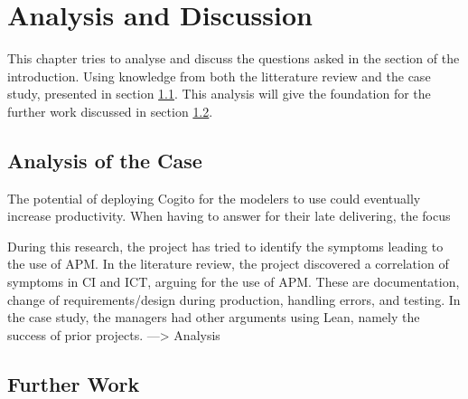 
\chapter{Analysis and Discussion}
This chapter tries to analyse and discuss the questions asked in the  section of the introduction. Using knowledge from both the litterature review and the case study, presented in section \ref{sec:analysis}. This analysis will give the foundation for the further work discussed in section \ref{sec:further_work}. 
\section{Analysis of the Case} \label{sec:analysis}

The potential of deploying Cogito for the modelers to use could eventually increase productivity. When having to answer for their late delivering, the focus  


During this research, the project has tried to identify the symptoms leading to the use of APM. In the literature review, the project discovered a correlation of symptoms in CI and ICT, arguing for the use of APM. These are documentation, change of requirements/design during production, handling errors, and testing. In the case study, the managers had other arguments using Lean, namely the success of prior projects. ---> Analysis
\section{Further Work} \label{sec:further_work}


\cleardoublepage